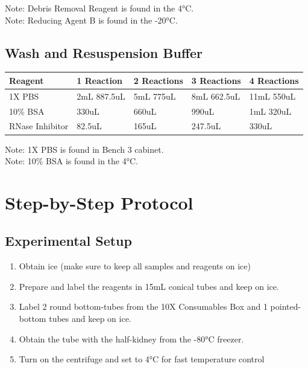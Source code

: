 \documentclass[
]{article}
\newcounter{none} %
\providecommand{\tightlist}{%
  \setlength{\itemsep}{0pt}\setlength{\parskip}{0pt}}
\begin{document}
Note: Debris Removal Reagent is found in the 4°C.\\
Note: Reducing Agent B is found in the -20°C.

\subsection{Wash and Resuspension
Buffer}\label{wash-and-resuspension-buffer}

{\def\LTcaptype{none} %
\begin{longtable}[]{@{}lllll@{}}
\toprule\noalign{}
Reagent & 1 Reaction & 2 Reactions & 3 Reactions & 4 Reactions \\
\midrule\noalign{}
\endhead
\bottomrule\noalign{}
\endlastfoot
1X PBS & 2mL 887.5uL & 5mL 775uL & 8mL 662.5uL & 11mL 550uL \\
10\% BSA & 330uL & 660uL & 990uL & 1mL 320uL \\
RNase Inhibitor & 82.5uL & 165uL & 247.5uL & 330uL \\
\end{longtable}
}

Note: 1X PBS is found in Bench 3 cabinet.\\
Note: 10\% BSA is found in the 4°C.

\section{Step-by-Step Protocol}\label{step-by-step-protocol}

\subsection{Experimental Setup}\label{experimental-setup}

\begin{enumerate}
\def\labelenumi{\arabic{enumi}.}
\tightlist
\item
  Obtain ice (make sure to keep all samples and reagents on ice)
\item
  Prepare and label the reagents in 15mL conical tubes and keep on ice.
\item
  Label 2 round bottom-tubes from the 10X Consumables Box and 1
  pointed-bottom tubes and keep on ice.
\item
  Obtain the tube with the half-kidney from the -80°C freezer.
\item
  Turn on the centrifuge and set to 4°C for fast temperature control
\end{enumerate}
\end{document}
